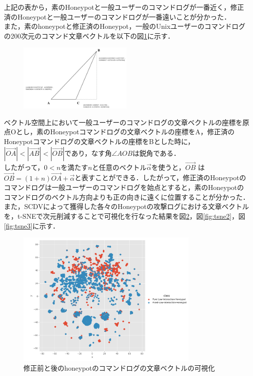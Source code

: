 上記の表から，素のHoneypotと一般ユーザーのコマンドログが一番近く，修正済のHoneypotと一般ユーザーのコマンドログが一番遠いことが分かった．\\
また，素のhoneypotと修正済のHoneypot，一般のUnixユーザーのコマンドログの200次元のコマンド文章ベクトルを以下の図\ref{fig:sankakuhi}に示す．
\clearpage

\begin{figure}[htbp]
    \centering
    \includegraphics[width=0.5\textwidth]{figures/sankakuhi.png}
    \label{fig:sankakuhi}
\end{figure}

ベクトル空間上において一般ユーザーのコマンドログの文章ベクトルの座標を原点Oとし，素のHoneypotコマンドログの文章ベクトルの座標をA，修正済のHoneypotコマンドログの文章ベクトルの座標をBとした時に，$ |\vec{OA}| < |\vec{AB}| < |\vec{OB}| $であり，なす角$ \angle AOB $は鋭角である．\\したがって，$ 0 < n $を満たす$ n $と任意のベクトル$ \vec{\alpha} $を使うと，$ \vec{OB} $ は $ \vec{OB} = (1+n)\vec{OA} + \vec{\alpha} $と表すことができる．したがって，修正済のHoneypotのコマンドログは一般ユーザーのコマンドログを始点とすると，素のHoneypotのコマンドログのベクトル方向よりも正の向きに遠くに位置することが分かった．\\
また，SCDVによって獲得した各々のHoneypotの攻撃ログにおける文章ベクトルを，t-SNEで次元削減することで可視化を行なった結果を図\ref{fig:tsne1}，図\ref{fig:tsne2}，図\ref{fig:tsne3}に示す．

\begin{figure}[htbp]
    \centering
    \includegraphics[width=0.8\textwidth]{figures/sufix.png}
    \caption{修正前と後のhoneypotのコマンドログの文章ベクトルの可視化}
    \label{fig:tsne1}
\end{figure}
\vspace{10mm}

